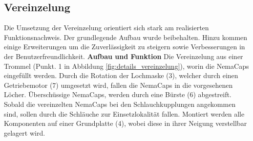 \subsection{Vereinzelung}
Die Umsetzung der Vereinzelung orientiert sich stark am realisierten Funktionsnachweis. Der grundlegende Aufbau wurde beibehalten. Hinzu kommen einige Erweiterungen um die Zuverlässigkeit zu steigern sowie Verbesserungen in der Benutzerfreundlichkeit.
\newline
\newline
\textbf{Aufbau und Funktion}
\newline
Die Vereinzelung aus einer Trommel (Punkt. 1 in Abbildung \ref{fig:details_vereinzelung}), worin die NemaCaps eingefüllt werden. Durch die Rotation der Lochmaske (3), welcher durch einen Getriebemotor (7) umgesetzt wird, fallen die NemaCaps in die vorgesehenen Löcher. Überschüssige NemaCaps, werden durch eine Bürste (6) abgestreift. Sobald die vereinzelten NemaCaps bei den Schlauchkupplungen angekommen sind, sollen durch die Schläuche zur Einsetzlokalität fallen. Montiert werden alle Komponenten auf einer Grundplatte (4), wobei diese in ihrer Neigung verstellbar gelagert wird.

